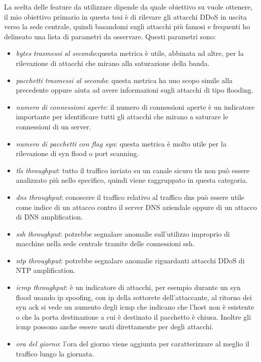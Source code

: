 La scelta delle feature da utilizzare dipende da quale obiettivo su vuole ottenere, il mio obiettivo primario in questa tesi è di rilevare gli attacchi DDoS in uscita verso la sede centrale, quindi basandomi sugli attacchi più famosi e frequenti ho delineato una lista di parametri da osservare. Questi parametri sono:
\begin{itemize}
    \item \emph{bytes trasmessi al secondo}:questa metrica è utile, abbinata ad altre, per la rilevazione di attacchi che mirano alla saturazione della banda.
    \item \emph{pacchetti trasmessi al secondo}: questa metrica ha uno scopo simile alla precedente oppure aiuta ad avere informazioni sugli attacchi di tipo flooding.
    \item \emph{numero di connessioni aperte}: il numero di connessioni aperte è un indicatore importante per identificare tutti gli attacchi che mirano a saturare le connessioni di un server. %
    \item \emph{numero di pacchetti con flag syn}: questa metrica è molto utile per la rilevazione di syn flood o port scanning.
    \item \emph{tls throughput}: tutto il traffico inviato su un canale sicuro tls non può essere analizzato più nello specifico, quindi viene raggruppato in questa categoria.
    \item \emph{dns throughput}: conoscere il traffico relativo al traffico dns può essere utile come indice di un attacco contro il server DNS aziendale oppure di un attacco di DNS amplification.
    \item \emph{ssh throughput}: potrebbe segnalare anomalie sull'utilizzo improprio di macchine nella sede centrale tramite delle connessioni ssh.
    \item \emph{ntp throughput}: potrebbe segnalare anomalie riguardanti attacchi DDoS di NTP amplification.
    \item \emph{icmp throughput}: è un indicatore di attacchi, per esempio durante un syn flood usando ip spoofing, con ip della sottorete dell'attaccante, al ritorno dei syn ack si vede un aumento degli icmp che indicano che l'host non è esistente o che la porta destinazione a cui è destinato il pacchetto è chiusa. Inoltre gli icmp possono anche essere usati direttamente per degli attacchi.
    \item \emph{ora del giorno}: l'ora del giorno viene aggiunta per caratterizzare al meglio il traffico lungo la giornata.
\end{itemize}

